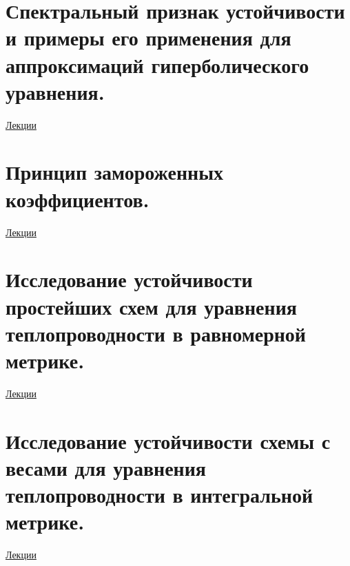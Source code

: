 \documentclass[specialist, subf, href, colorlinks=true, 12pt, times, mtpro, final]{disser}
\theoremstyle{definition}
\begin{document}
\section {Спектральный признак устойчивости и примеры его применения для аппроксимаций гиперболического уравнения.}
	\hyperlink {lects.130}{Лекции}\\

\section {Принцип замороженных коэффициентов.}
	\hyperlink {lects.132}{Лекции}\\

\section {Исследование устойчивости простейших схем для уравнения теплопроводности в равномерной метрике.}
	\hyperlink {lects.134}{Лекции}\\

\section {Исследование устойчивости схемы с весами для уравнения теплопроводности в интегральной метрике.}
	\hyperlink {lects.136}{Лекции}\\





\end{document}
